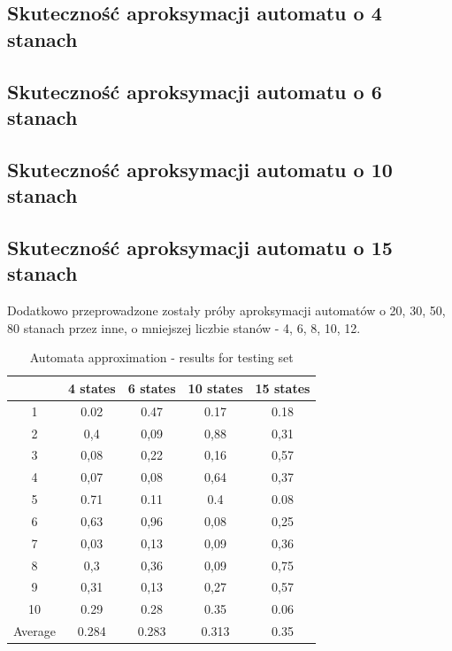 \documentclass[runningheads,a4paper]{llncs}
\begin{document}
\subsection{Skuteczność aproksymacji automatu o 4 stanach}

\subsection{Skuteczność aproksymacji automatu o 6 stanach}

\subsection{Skuteczność aproksymacji automatu o 10 stanach}

\subsection{Skuteczność aproksymacji automatu o 15 stanach}


Dodatkowo przeprowadzone zostały próby aproksymacji automatów o 20, 30, 50, 80 stanach przez inne, o mniejszej liczbie stanów - 4, 6, 8, 10, 12.

\begin{table}[]
\centering
\caption{Automata approximation - results for testing set}
\label{my-label}
\begin{tabular}{@{}ccccc@{}}
\toprule
        & 4 states & 6 states & 10 states & 15 states \\ \midrule
1       & 0.02     & 0.47     & 0.17      & 0.18      \\
2       & 0,4      & 0,09     & 0,88      & 0,31      \\
3       & 0,08     & 0,22     & 0,16      & 0,57      \\
4       & 0,07     & 0,08     & 0,64      & 0,37      \\
5       & 0.71     & 0.11     & 0.4       & 0.08      \\
6       & 0,63     & 0,96     & 0,08      & 0,25        \\
7       & 0,03     & 0,13     & 0,09      & 0,36        \\
8       & 0,3      & 0,36     & 0,09      & 0,75         \\
9       & 0,31     & 0,13     & 0,27      & 0,57     \\
10      & 0.29     & 0.28     & 0.35      & 0.06      \\
Average & 0.284    & 0.283    & 0.313     & 0.35      \\ \bottomrule
\end{tabular}
\end{table}
\end{document}
